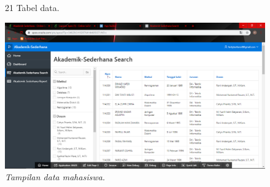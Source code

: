 \begin{enumerate}
\begin{figure}
\item[21]Tabel data.
    \begin{center}
\includegraphics[scale=0.2]{figures/20.png} 
    \caption{\textit{Tampilan data mahasiswa.}}
        \end{center}
\label{gambar}
\end{figure}
\end{enumerate}

